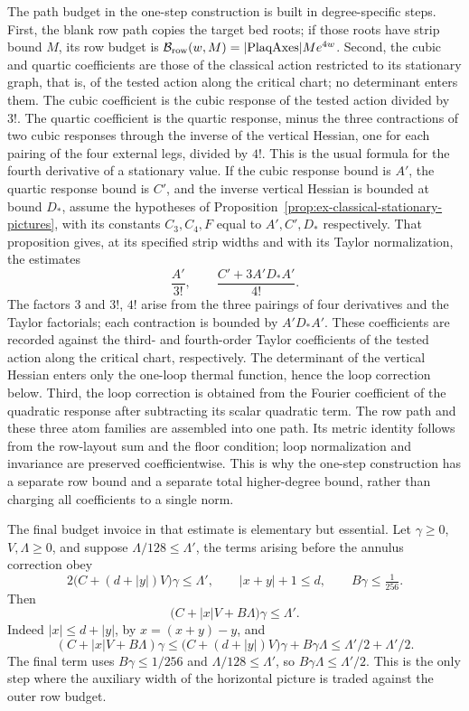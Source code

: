 The path budget in the one-step construction is built in degree-specific steps. First, the blank
row path copies the target bed roots; if those roots have strip bound $M$,
its row budget is $\mathcal B_{\rm row}(w,M)=|\mathrm{PlaqAxes}|M e^{4w}$.
Second, the cubic and quartic coefficients are those of the classical
action restricted to its stationary graph, that is, of the tested action
along the critical chart; no determinant enters them. The cubic
coefficient is the cubic response of the tested action divided by $3!$.
The quartic coefficient is the quartic response, minus the three
contractions of two cubic responses through the inverse of the vertical
Hessian, one for each pairing of the four external legs, divided by
$4!$. This is the usual formula for the fourth derivative of a
stationary value.
If the cubic response bound is $A'$, the quartic response bound is $C'$,
and the inverse vertical Hessian is bounded at bound $D_*$, assume the hypotheses of Proposition~\ref{prop:ex-classical-stationary-pictures}, with its constants $C_3,C_4,F$ equal to $A',C',D_*$ respectively. That proposition gives, at its specified strip widths and with its Taylor normalization, the estimates
\[
 \frac{A'}{3!},\qquad
 \frac{C'+3A'D_*A'}{4!}.
\]
The factors $3$ and $3!$, $4!$ arise from the three pairings of four
derivatives and the Taylor factorials; each contraction is bounded by
$A'D_*A'$. These coefficients are recorded against the
third- and fourth-order Taylor coefficients of the tested action along
the critical chart, respectively. The determinant of the vertical
Hessian enters only the one-loop thermal function, hence the loop
correction below. Third, the loop correction
is obtained from the Fourier coefficient of the quadratic response after
subtracting its scalar quadratic term. The row path and these three atom
families are assembled into one path. Its metric identity follows from the
row-layout sum and the floor condition; loop normalization and invariance
are preserved coefficientwise. This is why the one-step construction has a
separate row bound and a separate total higher-degree bound, rather than
charging all coefficients to a single norm.

The final budget invoice in that estimate is elementary but essential. Let
$\gamma\geq0$, $V,\Lambda\geq0$, and suppose $\Lambda/128\leq\Lambda'$, the
terms arising before the annulus correction obey
\[
 2\bigl(C+(d+|y|)V\bigr)\gamma\leq\Lambda',
 \qquad |x+y|+1\leq d,
 \qquad B\gamma\leq\tfrac1{256}.
\]
Then
\begin{equation}
 \bigl(C+|x|V+B\Lambda\bigr)\gamma\leq\Lambda'.
 \label{eq:path-cap-invoice}
\end{equation}
Indeed $|x|\leq d+|y|$, by $x=(x+y)-y$, and
\[
 (C+|x|V+B\Lambda)\gamma
 \leq \bigl(C+(d+|y|)V\bigr)\gamma+B\gamma\Lambda
 \leq \Lambda'/2+\Lambda'/2.
\]
The final term uses $B\gamma\leq1/256$ and $\Lambda/128\leq\Lambda'$, so
$B\gamma\Lambda\leq\Lambda'/2$. This is
the only step where the auxiliary width of the horizontal picture is traded
against the outer row budget.

